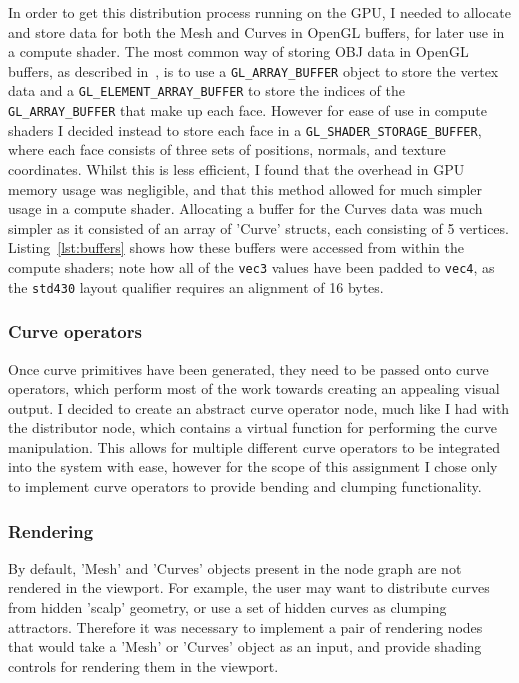 \documentclass[]{acmsiggraph}
\begin{document}
In order to get this distribution process running on the GPU, I needed to allocate and store data for both the Mesh and Curves in OpenGL buffers, for later use in a compute shader. The most common way of storing OBJ data in OpenGL buffers, as described in~\cite{objLoading}, is to use a \verb|GL_ARRAY_BUFFER| object to store the vertex data and a \verb|GL_ELEMENT_ARRAY_BUFFER| to store the indices of the \verb|GL_ARRAY_BUFFER| that make up each face. However for ease of use in compute shaders I decided instead to store each face in a \verb|GL_SHADER_STORAGE_BUFFER|, where each face consists of three sets of positions, normals, and texture coordinates. Whilst this is less efficient, I found that the overhead in GPU memory usage was negligible, and that this method allowed for much simpler usage in a compute shader. Allocating a buffer for the Curves data was much simpler as it consisted of an array of 'Curve' structs, each consisting of 5 vertices. Listing~\ref{lst:buffers} shows how these buffers were accessed from within the compute shaders; note how all of the \texttt{vec3} values have been padded to \texttt{vec4}, as the \texttt{std430} layout qualifier requires an alignment of 16 bytes.

\subsubsection{Curve operators} \label{sec:operators}

Once curve primitives have been generated, they need to be passed onto curve operators, which perform most of the work towards creating an appealing visual output. I decided to create an abstract curve operator node, much like I had with the distributor node, which contains a virtual function for performing the curve manipulation. This allows for multiple different curve operators to be integrated into the system with ease, however for the scope of this assignment I chose only to implement curve operators to provide bending and clumping functionality.

\subsubsection{Rendering} \label{sec:rendering}

By default, 'Mesh' and 'Curves' objects present in the node graph are not rendered in the viewport. For example, the user may want to distribute curves from hidden 'scalp' geometry, or use a set of hidden curves as clumping attractors. Therefore it was necessary to implement a pair of rendering nodes that would take a 'Mesh' or 'Curves' object as an input, and provide shading controls for rendering them in the viewport.
\end{document}
